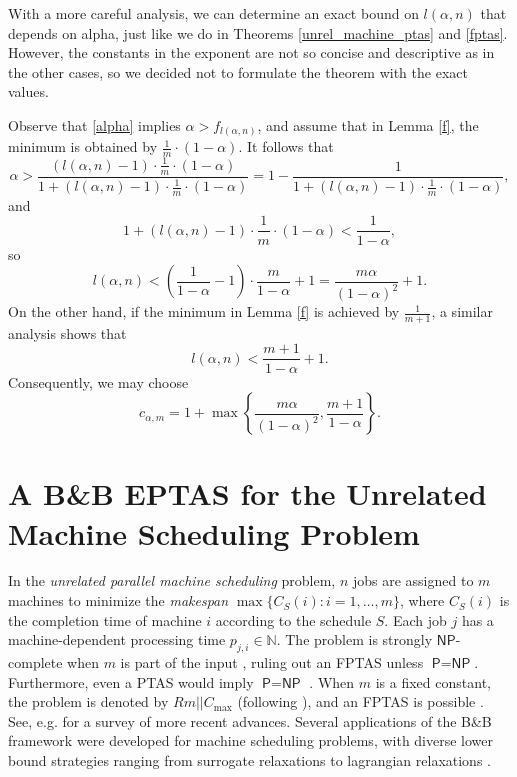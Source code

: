\documentclass[moor,sglanonrev]{informs4}
\theoremstyle{plain}
\begin{document}
\begin{remark}
    With a more careful analysis, we can determine an exact bound on $l(\alpha, n)$ that depends on alpha, just like we do in Theorems \ref{unrel_machine_ptas} and \ref{fptas}. However, the constants in the exponent are not so concise and descriptive as in the other cases, so we decided not to formulate the theorem with the exact values. 
    
    Observe that \eqref{alpha} implies $\alpha > f_{l(\alpha, n)}$, and assume that in Lemma \ref{f}, the minimum is obtained by $\frac{1}{m}\cdot (1-\alpha)$. It follows that 
    \[
    \alpha > \frac{(l(\alpha,n)-1)\cdot \frac{1}{m}\cdot (1-\alpha)}{1+(l(\alpha,n)-1)\cdot \frac{1}{m}\cdot (1-\alpha)} = 1- \frac{1}{1+(l(\alpha,n)-1)\cdot \frac{1}{m}\cdot (1-\alpha)},
    \]
    and 
    \[
    1+(l(\alpha,n)-1)\cdot \frac{1}{m}\cdot (1-\alpha) < \frac{1}{1-\alpha},
    \]
    so
    \[
    l(\alpha,n) < \left(\frac{1}{1-\alpha} -1\right)\cdot \frac{m}{1-\alpha} + 1= \frac{m\alpha}{(1-\alpha)^2}+1.
    \]
    On the other hand, if the minimum in Lemma \ref{f} is achieved by $\frac{1}{m+1}$, a similar analysis shows that 
    \[
    l(\alpha, n) < \frac{m+1}{1-\alpha} + 1.
    \]
    Consequently, we may choose
    \[
    c_{\alpha, m} = 1+\max\left\{\frac{m\alpha}{(1-\alpha)^2}, \frac{m+1}{1-\alpha}\right\}.
    \]
\end{remark}


\section{A B\&B EPTAS for the Unrelated Machine Scheduling Problem}\label{sec:js_ptas}

In the \emph{unrelated parallel machine scheduling} problem, $n$ jobs are assigned to $m$ machines to minimize the \emph{makespan} $\max\{C_S(i) : i = 1, \dots, m\}$, where $C_S(i)$ is the completion time of machine $i$ according to the schedule $S$. Each job $j$ has a machine-dependent processing time $p_{j, i} \in \mathbb{N}$. The problem is strongly $\textsf{NP}$-complete when $m$ is part of the input \cite{garey_johnson_1}, ruling out an FPTAS unless $\textsf{P} = \textsf{NP}$. Furthermore, even a PTAS would imply $\textsf{P} = \textsf{NP}$ \cite{lenstra_shmoys_tardos}. When $m$ is a fixed constant, the problem is denoted by $Rm || C_{\max}$ (following \cite{machine_scheduling_review}), and an FPTAS is possible \cite{horowitz_sahni_job_fptas,grouping_1}. See, e.g. \cite{job_survey} for a survey of more recent advances. Several applications of the B\&B framework were developed for machine scheduling problems, with diverse lower bound strategies ranging from surrogate relaxations \cite{van_de_velde} to lagrangian relaxations \cite{martello_soumis_toth}.  
\end{document}
